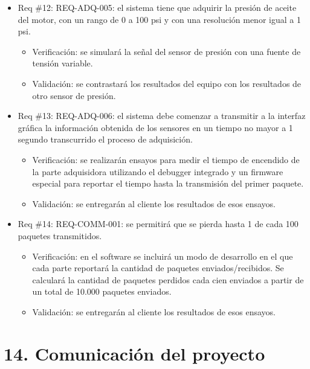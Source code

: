 \documentclass[11pt]{charter}
\begin{document}
\begin{itemize} 
\item Req \#12: REQ-ADQ-005: el sistema tiene que adquirir la presión de aceite del motor, con
un rango de 0 a 100 psi y con una resolución menor igual a 1 psi.
\begin{itemize}
\item Verificación: se simulará la señal del sensor de presión con una fuente de tensión variable.
\item Validación: se contrastará los resultados del equipo con los resultados de otro sensor de presión.
\end{itemize}
\end{itemize}

\begin{itemize} 
\item Req \#13: REQ-ADQ-006: el sistema debe comenzar a transmitir a la interfaz gráfica la
información obtenida de los sensores en un tiempo no mayor a 1 segundo transcurrido
el proceso de adquisición.
\begin{itemize}
\item Verificación: se realizarán ensayos para medir el tiempo de encendido de la parte adquisidora utilizando el debugger integrado y un firmware especial para reportar el tiempo hasta la transmisión del primer paquete.
\item Validación: se entregarán al cliente los resultados de esos ensayos.
\end{itemize}
\end{itemize}

\begin{itemize} 
\item Req \#14: REQ-COMM-001: se permitirá que se pierda hasta 1 de cada 100 paquetes
transmitidos.
\begin{itemize}
\item Verificación: en el software se incluirá un modo de desarrollo en el que cada parte reportará la cantidad de paquetes enviados/recibidos. Se calculará la cantidad de paquetes perdidos cada cien enviados a partir de un total de 10.000 paquetes enviados.
\item Validación: se entregarán al cliente los resultados de esos ensayos.
\end{itemize}
\end{itemize}

\section{14. Comunicación del proyecto}
\label{sec:comunicaciones}
\end{document}
